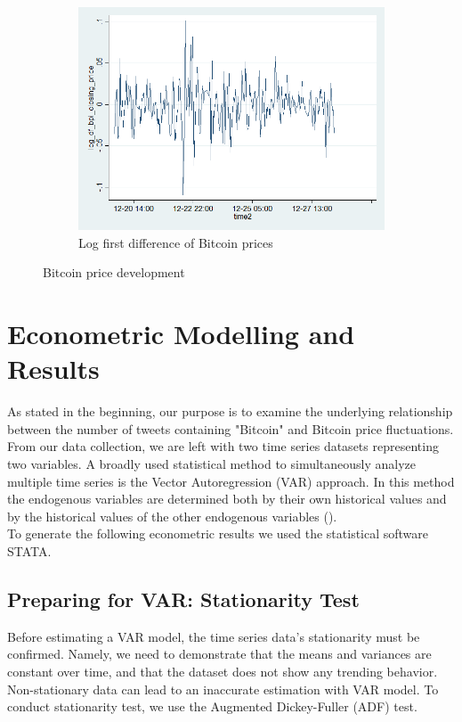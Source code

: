 \documentclass[a4paper,american,12pt]{article}
\begin{document}
\begin{spacing}{1.2}
\begin{figure}[H]
\begin{subfigure}{.3\textwidth}
	\includegraphics[width=1.12\textwidth]{stata_export_graphs/graph_plot_log_df_bpi.png}
	\caption{Log first difference of Bitcoin prices}
	\end{subfigure}
\caption{Bitcoin price development}
\end{figure}
	
\clearpage

\section{Econometric Modelling and Results}
\label{sec:EconometricModellingandResults}
As stated in the beginning, our purpose is to examine the underlying relationship between the number of tweets containing "Bitcoin" and Bitcoin price fluctuations. From our data collection, we are left with two time series datasets representing two variables. A broadly used statistical method to simultaneously analyze multiple time series is the Vector Autoregression (VAR) approach. In this method the endogenous variables are determined both by their own historical values and by the historical values of the other endogenous variables (\cite[pp.~4--5]{luetkepohl2007new}).\\
To generate the following econometric results we used the statistical software STATA.

\subsection{Preparing for VAR: Stationarity Test}
Before estimating a VAR model, the time series data's stationarity must be confirmed. Namely, we need to demonstrate that the means and variances are constant over time, and that the dataset does not show any trending behavior. Non-stationary data can lead to an inaccurate estimation with VAR model. To conduct stationarity test, we use the Augmented Dickey-Fuller (ADF) test.\\


\end{spacing}
\end{document}
